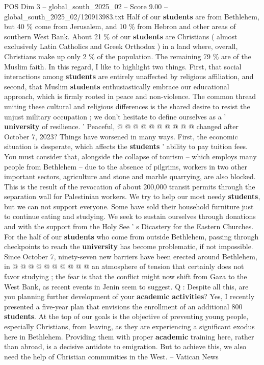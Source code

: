 \begin{textsample}{POS Dim 3 – global\_south\_2025\_02 – Score 9.00 – global\_south\_2025\_02/120913983.txt}
Half of our \textbf{students} are from Bethlehem, but 40 \% come from Jerusalem, and 10 \% from Hebron and other areas of southern West Bank.
About 21 \% of our \textbf{students} are Christians ( almost exclusively Latin Catholics and Greek Orthodox ) in a land where, overall, Christians make up only 2 \% of the population.
The remaining 79 \% are of the Muslim faith.
In this regard, I like to highlight two things.
First, that social interactions among \textbf{students} are entirely unaffected by religious affiliation, and second, that Muslim \textbf{students} enthusiastically embrace our educational approach, which is firmly rooted in peace and non-violence.
The common thread uniting these cultural and religious differences is the shared desire to resist the unjust military occupation ; we don't hesitate to define ourselves as a ' \textbf{university} of resilience. ' Peaceful, @ @ @ @ @ @ @ @ @ @ changed after October 7, 2023?
Things have worsened in many ways.
First, the economic situation is desperate, which affects the \textbf{students} ' ability to pay tuition fees.
You must consider that, alongside the collapse of tourism -- which employs many people from Bethlehem -- due to the absence of pilgrims, workers in two other important sectors, agriculture and stone and marble quarrying, are also blocked.
This is the result of the revocation of about 200,000 transit permits through the separation wall for Palestinian workers.
We try to help our most needy \textbf{students}, but we can not support everyone.
Some have sold their household furniture just to continue eating and studying.
We seek to sustain ourselves through donations and with the support from the Holy See ' s Dicastery for the Eastern Churches.
For the half of our \textbf{students} who come from outside Bethlehem, passing through checkpoints to reach the \textbf{university} has become problematic, if not impossible.
Since October 7, ninety-seven new barriers have been erected around Bethlehem, in @ @ @ @ @ @ @ @ @ @ an atmosphere of tension that certainly does not favor studying ; the fear is that the conflict might now shift from Gaza to the West Bank, as recent events in Jenin seem to suggest.
Q : Despite all this, are you planning further development of your \textbf{academic} \textbf{activities}?
Yes, I recently presented a five-year plan that envisions the enrollment of an additional 800 \textbf{students}.
At the top of our goals is the objective of preventing young people, especially Christians, from leaving, as they are experiencing a significant exodus here in Bethlehem.
Providing them with proper \textbf{academic} training here, rather than abroad, is a decisive antidote to emigration.
But to achieve this, we also need the help of Christian communities in the West. -- Vatican News

\end{textsample}
